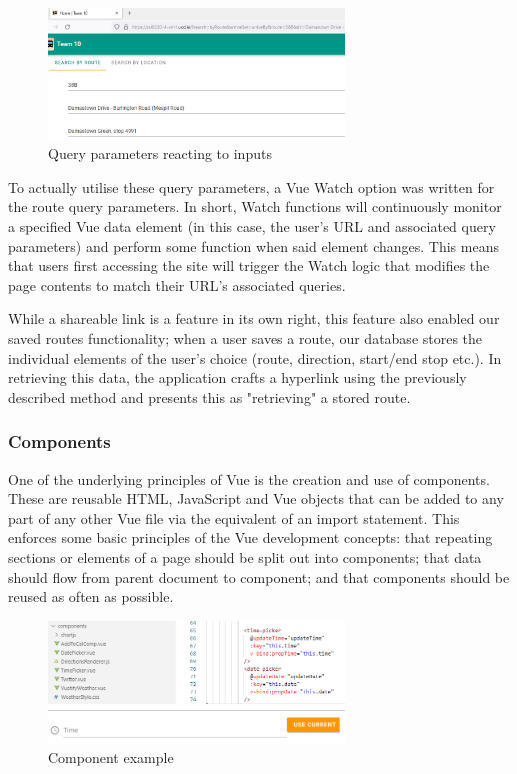 \documentclass[]{UCD_CS_47360_Report}
\begin{document}
\begin{figure}[!htb]
    \centering
    \includegraphics[width=0.7\textwidth]{figures/URLParams.PNG}
    \caption{Query parameters reacting to inputs}
    \label{fig:QueryURL}
\end{figure}

To actually utilise these query parameters, a Vue Watch option was written for the route query parameters. In short, Watch functions will continuously monitor a specified Vue data element (in this case, the user's URL and associated query parameters) and perform some function when said element changes. This means that users first accessing the site will trigger the Watch logic that modifies the page contents to match their URL's associated queries.

While a shareable link is a feature in its own right, this feature also enabled our saved routes functionality; when a user saves a route, our database stores the individual elements of the user's choice (route, direction, start/end stop etc.). In retrieving this data, the application crafts a hyperlink using the previously described method and presents this as "retrieving" a stored route.

\subsubsection{Components}
One of the underlying principles of Vue is the creation and use of components. These are reusable HTML, JavaScript and Vue objects that can be added to any part of any other Vue file via the equivalent of an import statement. This enforces some basic principles of the Vue development concepts: that repeating sections or elements of a page should be split out into components; that data should flow from parent document to component; and that components should be reused as often as possible. 

\begin{figure}[!htb]
    \centering
    \includegraphics[width=0.7\textwidth]{figures/componentFinal.png}
    \caption{Component example}
    \label{fig:ComponentExample}
\end{figure}
\end{document}
